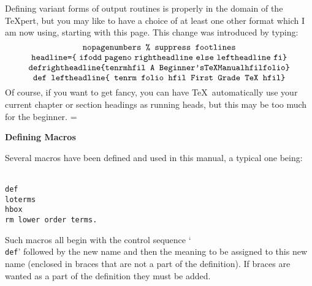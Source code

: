 Defining variant forms of output routines is properly in the domain of
the \TeX pert, but you may like to have a choice of at least one other format
which I am now using, starting with this page. This change was introduced by
typing:
$$\vbox{\tt {\halign{#\hfil\cr
\\nopagenumbers \% suppress footlines\cr
\\headline=\lbr\\ifodd\\pageno\\rightheadline \\else\\leftheadline\\fi\rbr\cr
\\def\\rightheadline\lbr\\tenrm\\hfil A Beginner's \\TeX\\ Manual\\hfil\\folio\rbr\cr
\\def\\leftheadline\lbr\\tenrm\\folio\\hfil First Grade \\TeX \\hfil\rbr\cr
}}}$$
Of course, if you want to get fancy, you can have \TeX\ automatically use your
current chapter or section headings as running heads, but this may be too much
for the beginner.
\nopagenumbers %
\headline={\ifodd\pageno\rightheadline \else\leftheadline\fi}
\def\rightheadline{\tenrm\hfil A Beginner's \TeX\ Manual\hfil\folio}
\def\leftheadline{\tenrm\folio\hfil First Grade \TeX \hfil}

{\bf Defining Macros}

Several macros have been defined and used in this manual, a typical one being:
\medskip
\centerline{\tt \\def\\loterms\lbr \\hbox\lbr \\rm lower order terms\rrbr.}
\smallskip
Such macros all
begin with the control sequence
`{\tt \\def}' followed by the new name and then the meaning to be assigned to
this new name (enclosed in braces that are not a part of the definition).
If braces are wanted as a part of the definition they must be added.

